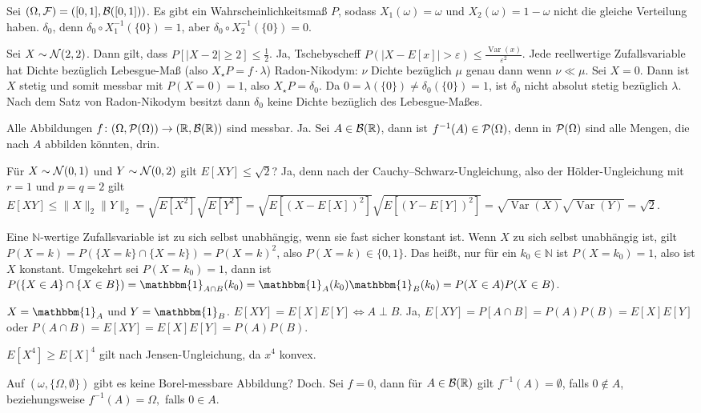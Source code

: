 \documentclass{article}
\begin{document}
Sei $(\Omega,{\cal F})=([0,1],{\cal B}([0,1]))$.
Es gibt ein Wahrscheinlichkeitsmaß $P$, sodass $X_1(\omega)=\omega$ und $X_2(\omega)=1-\omega$ nicht die gleiche Verteilung haben.
$\delta_0$, denn $\delta_0\circ X_1^{-1}(\{0\})=1$, aber $\delta_0\circ X_2^{-1}(\{0\})=0$.

Sei $X\sim{\cal N}(2,2)$. Dann gilt, dass $P[|X-2|\geq2]\leq\frac{1}{2}$.
Ja, Tschebyscheff $P(|X-E[x]|>\varepsilon)\leq\frac{\operatorname{Var}(x)}{\varepsilon^2}$.
Jede reellwertige Zufallsvariable hat Dichte bezüglich Lebesgue-Maß (also $X_\star P=f\cdot\lambda$)
Radon-Nikodym: $\nu$ Dichte bezüglich $\mu$ genau dann wenn $\nu\ll \mu$.
Sei $X=0$.
Dann ist $X$ stetig und somit messbar mit $P(X=0)=1$, also $X_\star P=\delta_0$.
Da $0=\lambda(\{0\})\neq\delta_0(\{0\})=1$, ist $\delta_0$ nicht absolut stetig bezüglich $\lambda$.
Nach dem Satz von Radon-Nikodym besitzt dann $\delta_0$ keine Dichte bezüglich des Lebesgue-Maßes.

Alle Abbildungen $f\colon (\Omega,{\cal P}(\Omega))\to(\mathbb{R},{\cal B}(\mathbb{R}))$ sind messbar.
Ja.
Sei $A\in{\cal B}(\mathbb{R})$, dann ist $f^{-1}(A)\in{\cal P}(\Omega)$, denn in ${\cal P}(\Omega)$ sind alle Mengen, die nach $A$ abbilden könnten, drin.

Für $X\sim{\cal N}(0,1)$ und $Y\sim{\cal N}(0,2)$ gilt $E[XY]\leq\sqrt{2}$?
Ja, denn nach der Cauchy--Schwarz-Ungleichung, also der Hölder-Ungleichung mit $r=1$ und $p=q=2$ gilt
$E[XY]
\leq\|X\|_2\|Y\|_2
=\sqrt{E[X^2]}\sqrt{E[Y^2]}
=\sqrt{E[(X-E[X])^2]}\sqrt{E[(Y-E[Y])^2]}
=\sqrt{\operatorname{Var}(X)}\sqrt{\operatorname{Var}(Y)}
=\sqrt{2}$.

Eine $\mathbb{N}$-wertige Zufallsvariable ist zu sich selbst unabhängig, wenn sie fast sicher konstant ist.
Wenn $X$ zu sich selbst unabhängig ist, gilt $P(X=k)=P(\{X=k\}\cap\{X=k\})=P(X=k)^2$, also $P(X=k)\in\{0,1\}$.
Das heißt, nur für ein $k_0\in\mathbb{N}$ ist $P(X=k_0)=1$, also ist $X$ konstant.
Umgekehrt sei $P(X=k_0)=1$, dann ist $P(\{X\in A\}\cap\{X\in B\})=\mathbbm{1}_{A\cap B}(k_0)=\mathbbm{1}_{A}(k_0)\mathbbm{1}_{B}(k_0)=P(X\in A)P(X\in B)$.

$X=\mathbbm{1}_A$ und $Y=\mathbbm{1}_B$.
$E[XY]=E[X]E[Y]\iff A\perp B$.
Ja, $E[XY]=P[A\cap B]=P(A)P(B)=E[X]E[Y]$ oder $P(A\cap B)=E[XY]=E[X]E[Y]=P(A)P(B)$.

$E[X^4]\geq E[X]^4$ gilt nach Jensen-Ungleichung, da $x^4$ konvex.

Auf $(\omega,\{\Omega,\emptyset\})$ gibt es keine Borel-messbare Abbildung?
Doch.
Sei $f=0$, dann für $A\in{\cal B}(\mathbb{R})$ gilt $f^{-1}(A)=\emptyset$, falls $0\notin A$, beziehungsweise $f^{-1}(A)=\Omega,$ falls $0\in A$.
\end{document}
